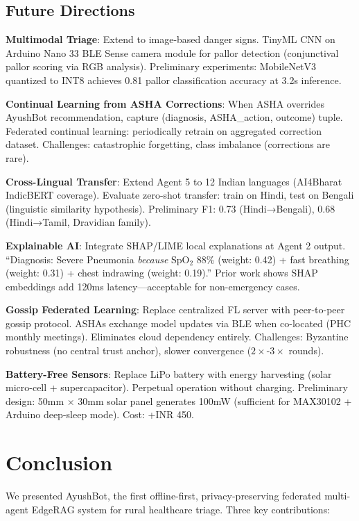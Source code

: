 \documentclass[conference,compsoc]{IEEEtran}
\begin{document}
\subsection{Future Directions}

\textbf{Multimodal Triage}: Extend to image-based danger signs. TinyML CNN on Arduino Nano 33 BLE Sense camera module for pallor detection (conjunctival pallor scoring via RGB analysis). Preliminary experiments: MobileNetV3 quantized to INT8 achieves 0.81 pallor classification accuracy at 3.2s inference.

\textbf{Continual Learning from ASHA Corrections}: When ASHA overrides AyushBot recommendation, capture (diagnosis, ASHA\_action, outcome) tuple. Federated continual learning: periodically retrain on aggregated correction dataset. Challenges: catastrophic forgetting, class imbalance (corrections are rare).

\textbf{Cross-Lingual Transfer}: Extend Agent 5 to 12 Indian languages (AI4Bharat IndicBERT coverage). Evaluate zero-shot transfer: train on Hindi, test on Bengali (linguistic similarity hypothesis). Preliminary F1: 0.73 (Hindi→Bengali), 0.68 (Hindi→Tamil, Dravidian family).

\textbf{Explainable AI}: Integrate SHAP/LIME local explanations at Agent 2 output. ``Diagnosis: Severe Pneumonia \textit{because} SpO\(_2\) 88\% (weight: 0.42) + fast breathing (weight: 0.31) + chest indrawing (weight: 0.19).'' Prior work \cite{explainable_fl_edge_2025} shows SHAP embeddings add 120ms latency—acceptable for non-emergency cases.

\textbf{Gossip Federated Learning}: Replace centralized FL server with peer-to-peer gossip protocol. ASHAs exchange model updates via BLE when co-located (PHC monthly meetings). Eliminates cloud dependency entirely. Challenges: Byzantine robustness (no central trust anchor), slower convergence (\(2\times\)-\(3\times\) rounds).

\textbf{Battery-Free Sensors}: Replace LiPo battery with energy harvesting (solar micro-cell + supercapacitor). Perpetual operation without charging. Preliminary design: 50mm × 30mm solar panel generates 100mW (sufficient for MAX30102 + Arduino deep-sleep mode). Cost: +INR 450.

\section{Conclusion}

We presented AyushBot, the first offline-first, privacy-preserving federated multi-agent EdgeRAG system for rural healthcare triage. Three key contributions:
\end{document}
